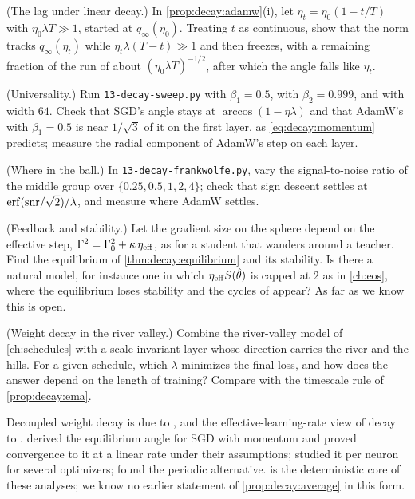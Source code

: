 \begin{refsection}
\begin{exercises}
\item \variation (The lag under linear decay.) In \cref{prop:decay:adamw}(i), let $\eta_t=\eta_0(1-t/T)$ with $\eta_0\lambda T\gg1$, started at $q_\infty(\eta_0)$. Treating $t$ as continuous, show that the norm tracks $q_\infty(\eta_t)$ while $\eta_t\lambda(T-t)\gg1$ and then freezes, with a remaining fraction of the run of about $(\eta_0\lambda T)^{-1/2}$, after which the angle falls like $\eta_t$.\label{ex:decay:lag}

\item \simulation (Universality.) Run \texttt{13-decay-sweep.py} with $\beta_1=0.5$, with $\beta_2=0.999$, and with width $64$. Check that SGD's angle stays at $\arccos(1-\eta\lambda)$ and that AdamW's with $\beta_1=0.5$ is near $1/\sqrt3$ of it on the first layer, as \eqref{eq:decay:momentum} predicts; measure the radial component of AdamW's step on each layer.\label{ex:decay:sim1}

\item \simulation (Where in the ball.) In \texttt{13-decay-frankwolfe.py}, vary the signal-to-noise ratio of the middle group over $\{0.25,0.5,1,2,4\}$; check that sign descent settles at $\operatorname{erf}(\mathrm{snr}/\sqrt2)/\lambda$, and measure where AdamW settles.\label{ex:decay:sim2}

\item \research (Feedback and stability.) Let the gradient size on the sphere depend on the effective step, $\Gamma^2=\Gamma_0^2+\kappa\,\eta_{\mathrm{eff}}$, as for a student that wanders around a teacher. Find the equilibrium of \cref{thm:decay:equilibrium} and its stability. Is there a natural model, for instance one in which $\eta_{\mathrm{eff}} S(\hat\theta)$ is capped at $2$ as in \cref{ch:eos}, where the equilibrium loses stability and the cycles of \textcite{LobachevaEtAl2021} appear? As far as we know this is open.\label{ex:decay:feedback}

\item \research (Weight decay in the river valley.) Combine the river-valley model of \cref{ch:schedules} with a scale-invariant layer whose direction carries the river and the hills. For a given schedule, which $\lambda$ minimizes the final loss, and how does the answer depend on the length of training? Compare with the timescale rule of \cref{prop:decay:ema}.\label{ex:decay:river}
\end{exercises}

\notesandrefs
Decoupled weight decay is due to \textcite{LoshchilovHutter2019}, and the effective-learning-rate view of decay to \textcite{VanLaarhoven2017}. \Textcite{WanEtAl2021} derived the equilibrium angle for SGD with momentum and proved convergence to it at a linear rate under their assumptions; \textcite{KossonMessmerJaggi2024} studied it per neuron for several optimizers; \textcite{LobachevaEtAl2021} found the periodic alternative.  is the deterministic core of these analyses; we know no earlier statement of \cref{prop:decay:average} in this form.


\end{refsection}
